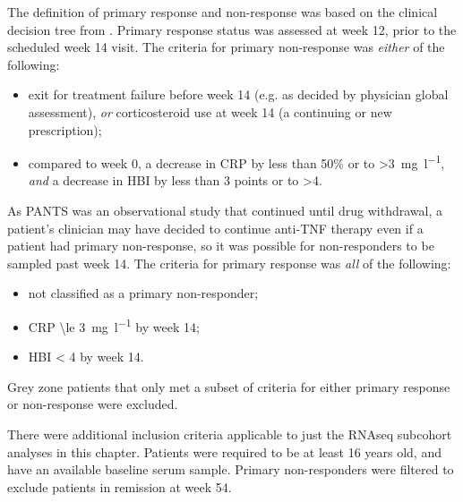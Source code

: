The definition of primary response and non-response was based on the clinical decision tree from \textcite{kennedy2019PredictorsAntiTNFTreatment}.
Primary response status was assessed at week 12, prior to the scheduled week 14 visit. 
The criteria for primary non-response was \emph{either} of the following: 
\begin{itemize}
    \item exit for treatment failure before week 14 (e.g. as decided by physician global assessment), \emph{or} corticosteroid use at week 14 (a continuing or new prescription);
    \item compared to week 0, a decrease in \gls{CRP} by less than 50\% or to >\SI{3}{\milli\gram\per\litre}, \emph{and} a decrease in \gls{HBI} by less than 3 points or to >4.
\end{itemize}
As \gls{PANTS} was an observational study that continued until drug withdrawal, a patient's clinician may have decided to continue anti-\gls{TNF} therapy even if a patient had primary non-response, so it was possible for non-responders to be sampled past week 14.
The criteria for primary response was \emph{all} of the following:
\begin{itemize}
    \item not classified as a primary non-responder;
    \item \gls{CRP} \SI{\le 3}{\milli\gram\per\litre} by week 14;
    \item \gls{HBI} < 4 by week 14.
\end{itemize}
Grey zone patients that only met a subset of criteria for either primary response or non-response were excluded.

%
There were additional inclusion criteria applicable to just the \gls{RNAseq} subcohort analyses in this chapter.
Patients were required to be at least 16 years old, and have an available baseline serum sample.
Primary non-responders were filtered to exclude patients in remission at week 54.

